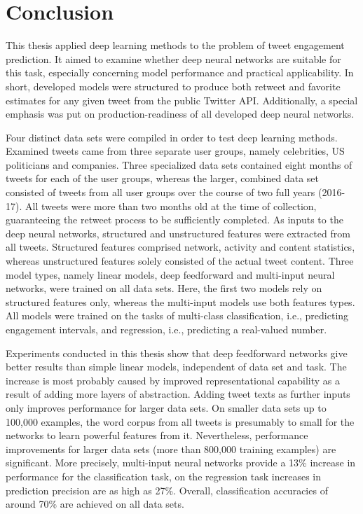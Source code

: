 \section{Conclusion}
\label{ch:conclusion}

This thesis applied deep learning methods to the problem of tweet engagement
prediction.
It aimed to examine whether deep neural networks are suitable for this task, 
especially concerning model performance and practical applicability.
In short, developed models were structured to produce both retweet and favorite
estimates for any given tweet from the public Twitter API.
Additionally, a special emphasis was put on production-readiness of all
developed deep neural networks.

Four distinct data sets were compiled in order to test deep learning methods.
Examined tweets came from three separate user groups, namely celebrities, US
politicians and companies.
Three specialized data sets contained eight months of tweets for each of the user
groups, whereas the larger, combined data set consisted of tweets from all
user groups over the course of two full years (2016-17).
All tweets were more than two months old at the time of collection, guaranteeing
the retweet process to be sufficiently completed.
As inputs to the deep neural networks, structured and unstructured features
were extracted from all tweets.
Structured features comprised network, activity and content statistics, whereas
unstructured features solely consisted of the actual tweet content.
Three model types, namely linear models, deep feedforward and multi-input
neural networks, were trained on all data sets.
Here, the first two models rely on structured features only, whereas the multi-input
models use both features types.
All models were trained on the tasks of multi-class classification, i.e.,
predicting engagement intervals, and regression, i.e., predicting a real-valued
number.

Experiments conducted in this thesis show that deep feedforward networks
give better results than simple linear models, independent of data set and task.
The increase is most probably caused by improved representational capability
as a result of adding more layers of abstraction.
Adding tweet texts as further inputs only improves performance for larger data
sets.
On smaller data sets up to 100,000 examples, the word corpus from all tweets
is presumably to small for the networks to learn powerful features from it.
Nevertheless, performance improvements for larger data sets (more than 800,000
training examples) are significant.
More precisely, multi-input neural networks provide a 13\% increase in performance
for the classification task, on the regression task increases in prediction
precision are as high as 27\%.
Overall, classification accuracies of around 70\% are achieved on all data sets.
